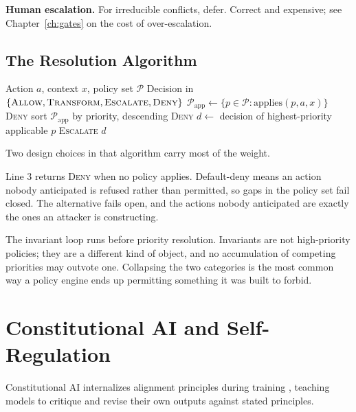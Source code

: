 \textbf{Human escalation.} For irreducible conflicts, defer. Correct and
expensive; see Chapter~\ref{ch:gates} on the cost of over-escalation.

\subsection{The Resolution Algorithm}

\begin{algorithm}
\caption{Priority-Ordered Conflict Resolution}
\begin{algorithmic}[1]
\Require Action $a$, context $x$, policy set $\mathcal{P}$
\Ensure Decision in $\{\textsc{Allow}, \textsc{Transform}, \textsc{Escalate}, \textsc{Deny}\}$
\State $\mathcal{P}_{\text{app}} \gets \{p \in \mathcal{P} : \text{applies}(p, a, x)\}$
    \State \Return \textsc{Deny} 
\EndIf
\State sort $\mathcal{P}_{\text{app}}$ by priority, descending
        \State \Return \textsc{Deny} 
    \EndIf
\EndFor
\State $d \gets$ decision of highest-priority applicable $p$
    \State \Return \textsc{Escalate}
\EndIf
\State \Return $d$
\end{algorithmic}
\end{algorithm}

Two design choices in that algorithm carry most of the weight.

Line 3 returns \textsc{Deny} when no policy applies. Default-deny means an action
nobody anticipated is refused rather than permitted, so gaps in the policy set
fail closed. The alternative fails open, and the actions nobody anticipated are
exactly the ones an attacker is constructing.

The invariant loop runs before priority resolution. Invariants are not
high-priority policies; they are a different kind of object, and no accumulation
of competing priorities may outvote one. Collapsing the two categories is the most
common way a policy engine ends up permitting something it was built to forbid.

\section{Constitutional AI and Self-Regulation}

Constitutional AI internalizes alignment principles during training
\cite{cai2022}, teaching models to critique and revise their own outputs against
stated principles.

